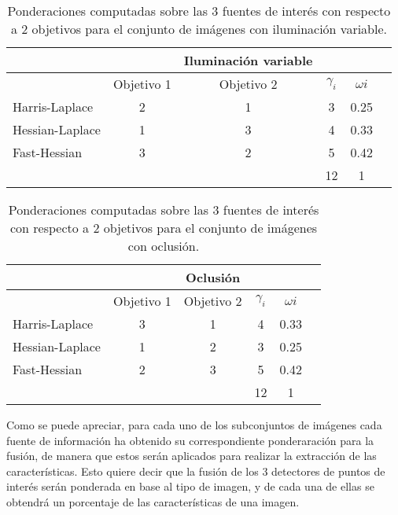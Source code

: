 \begin{table}[h]
\begin{center}
\begin{tabular}{@{}lccccc@{}}
\toprule
&	&  	Iluminación variable		& &  \\ \hline
&Objetivo 1   &  Objetivo 2   & \( \gamma_{i} \) &  \( \omega{i} \) \\ \hline
Harris-Laplace& 2    &  1 & 3 & 0.25 \\
Hessian-Laplace& 1   &  3  & 4 & 0.33 \\
Fast-Hessian& 3  &  	2 & 5 & 0.42  \\ \hline
&   &  	 & 12 & 1  \\ \hline

\end{tabular}
\end{center}
\caption{Ponderaciones computadas sobre las 3 fuentes de interés con respecto a 2 objetivos para el conjunto de imágenes con iluminación variable.}
\label{my_tabla}
\end{table}

\begin{table}[h]
\begin{center}
\begin{tabular}{@{}lccccc@{}}
\toprule
&	&  	Oclusión		& &  \\ \hline
&Objetivo 1   &  Objetivo 2   & \( \gamma_{i} \) &  \( \omega{i} \) \\ \hline
Harris-Laplace& 3    &  1 & 4 & 0.33 \\
Hessian-Laplace& 1   &  2  & 3 & 0.25 \\
Fast-Hessian& 2  &  	3 & 5 & 0.42  \\ \hline
&   &  	 & 12 & 1  \\ \hline

\end{tabular}
\end{center}
\caption{Ponderaciones computadas sobre las 3 fuentes de interés con respecto a 2 objetivos para el conjunto de imágenes con oclusión.}
\label{my_tabla}
\end{table}

Como se puede apreciar, para cada uno de los subconjuntos de imágenes cada fuente de información ha obtenido su correspondiente ponderaración para la fusión, de manera que estos serán aplicados para realizar la extracción de las características. Esto quiere decir que la fusión de los 3 detectores de puntos de interés serán ponderada en base al tipo de imagen, y de cada una de ellas se obtendrá un porcentaje de las características de una imagen. \\

